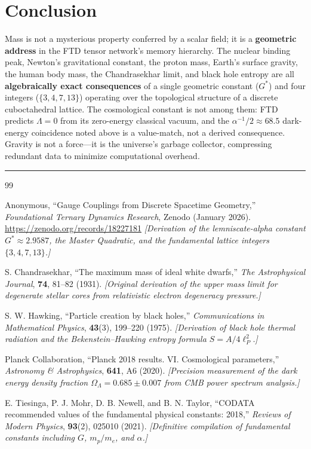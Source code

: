 \documentclass[11pt, letterpaper]{article}
\newcommand{\G}{G^*}
\theoremstyle{definition}
\theoremstyle{remark}
\begin{document}
\section{Conclusion}

Mass is not a mysterious property conferred by a scalar field; it is a \textbf{geometric address} in the FTD tensor network's memory hierarchy. The nuclear binding peak, Newton's gravitational constant, the proton mass, Earth's surface gravity, the human body mass, the Chandrasekhar limit, and black hole entropy are all \textbf{algebraically exact consequences} of a single geometric constant ($\G$) and four integers ($\{3, 4, 7, 13\}$) operating over the topological structure of a discrete cuboctahedral lattice. The cosmological constant is not among them: FTD predicts $\Lambda = 0$ from its zero-energy classical vacuum, and the $\alpha^{-1}/2 \approx 68.5$ dark-energy coincidence noted above is a value-match, not a derived consequence. Gravity is not a force---it is the universe's garbage collector, compressing redundant data to minimize computational overhead.

\vspace{2em}
\hrule
\vspace{1.5em}

\begin{thebibliography}{99}

Anonymous,
``Gauge Couplings from Discrete Spacetime Geometry,''
\textit{Foundational Ternary Dynamics Research}, Zenodo (January 2026).
\url{https://zenodo.org/records/18227181}
\newblock \textit{[Derivation of the lemniscate-alpha constant $\G \approx 2.9587$, the Master Quadratic, and the fundamental lattice integers $\{3, 4, 7, 13\}$.]}

S. Chandrasekhar,
``The maximum mass of ideal white dwarfs,''
\textit{The Astrophysical Journal}, \textbf{74}, 81--82 (1931).
\newblock \textit{[Original derivation of the upper mass limit for degenerate stellar cores from relativistic electron degeneracy pressure.]}

S. W. Hawking,
``Particle creation by black holes,''
\textit{Communications in Mathematical Physics}, \textbf{43}(3), 199--220 (1975).
\newblock \textit{[Derivation of black hole thermal radiation and the Bekenstein--Hawking entropy formula $S = A / 4\ell_P^2$.]}

Planck Collaboration,
``Planck 2018 results. VI. Cosmological parameters,''
\textit{Astronomy \& Astrophysics}, \textbf{641}, A6 (2020).
\newblock \textit{[Precision measurement of the dark energy density fraction $\Omega_\Lambda = 0.685 \pm 0.007$ from CMB power spectrum analysis.]}

E. Tiesinga, P. J. Mohr, D. B. Newell, and B. N. Taylor,
``CODATA recommended values of the fundamental physical constants: 2018,''
\textit{Reviews of Modern Physics}, \textbf{93}(2), 025010 (2021).
\newblock \textit{[Definitive compilation of fundamental constants including $G$, $m_p/m_e$, and $\alpha$.]}

\end{thebibliography}
\end{document}
